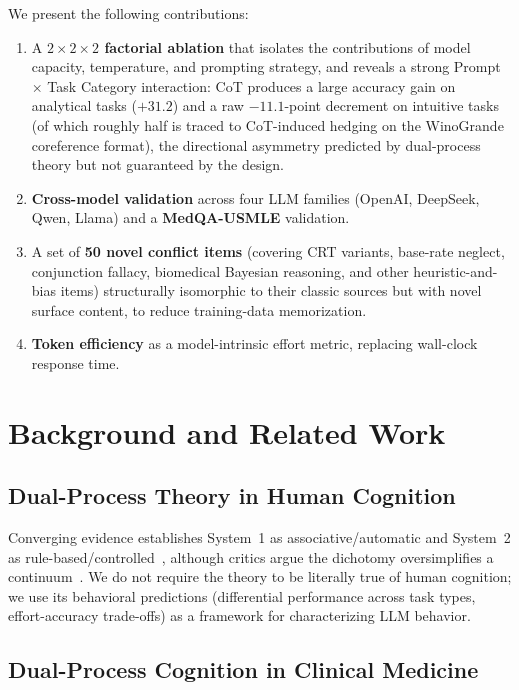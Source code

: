 \documentclass[conference]{IEEEtran}
\begin{document}
We present the following contributions:

\begin{enumerate}
\item A \textbf{$2 \times 2 \times 2$ factorial ablation} that isolates the contributions of model capacity, temperature, and prompting strategy, and reveals a strong Prompt $\times$ Task Category interaction: CoT produces a large accuracy gain on analytical tasks ($+31.2$) and a raw $-11.1$-point decrement on intuitive tasks (of which roughly half is traced to CoT-induced hedging on the WinoGrande coreference format), the directional asymmetry predicted by dual-process theory but not guaranteed by the design.
\item \textbf{Cross-model validation} across four LLM families (OpenAI, DeepSeek, Qwen, Llama) and a \textbf{MedQA-USMLE} validation.
\item A set of \textbf{50 novel conflict items} (covering CRT variants, base-rate neglect, conjunction fallacy, biomedical Bayesian reasoning, and other heuristic-and-bias items) structurally isomorphic to their classic sources but with novel surface content, to reduce training-data memorization.
\item \textbf{Token efficiency} as a model-intrinsic effort metric, replacing wall-clock response time.
\end{enumerate}

\section{Background and Related Work}
\label{sec:background}

\subsection{Dual-Process Theory in Human Cognition}

Converging evidence establishes System~1 as associative/automatic and System~2 as rule-based/controlled~\cite{Sloman1996, Evans2008}, although critics argue the dichotomy oversimplifies a continuum~\cite{Evans2013}. We do not require the theory to be literally true of human cognition; we use its behavioral predictions (differential performance across task types, effort-accuracy trade-offs) as a framework for characterizing LLM behavior.

\subsection{Dual-Process Cognition in Clinical Medicine}
\end{document}

